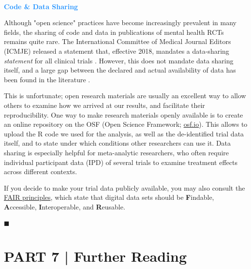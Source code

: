 \begin{box-info} \\
\textcolor{dodgerblue}{\textbf{Code \& Data Sharing}}

\vspace{2mm}

Although "open science" practices have become increasingly prevalent in many fields, the sharing of code and data in publications of mental health RCTs remains quite rare. The International Committee of Medical Journal Editors (ICMJE) released a statement that, effective 2018, mandates a data-sharing \emph{statement} for all clinical trials \citep{taichman2017data}. However, this does not mandate data sharing itself, and a large gap between the declared and actual availability of data has been found in the literature \citep{naudet2018data, danchev2021evaluation}. 

\vspace{2mm}

\hspace*{5mm} This is unfortunate; open research materials are usually an excellent way to allow others to examine how we arrived at our results, and facilitate their reproducibility. One way to make research materials openly available is to create an online repository on the OSF (Open Science Framework; \href{https://osf.io/}{osf.io}). This allows to upload the \textsf{R} code we used for the analysis, as well as the de-identified trial data itself, and to state under which conditions other researchers can use it. Data sharing is especially helpful for meta-analytic researchers, who often require individual participant data (IPD) of several trials to examine treatment effects across different contexts. 

\vspace{2mm}

\hspace*{5mm} If you decide to make your trial data publicly available, you may also consult the \href{https://www.go-fair.org/fair-principles/}{FAIR principles}, which state that digital data sets should be \textbf{F}indable, \textbf{A}ccessible, \textbf{I}nteroperable, and \textbf{R}eusable. 

\end{box-info}

\begin{flushright}
    $\blacksquare$
\end{flushright}
\vspace{-10mm}

\section{{\textsf{\textcolor{sBlue}{\small PART 7 |}}} Further Reading}

